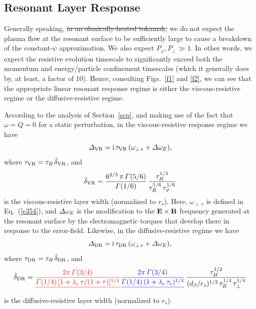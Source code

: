 \documentclass[12pt,prb,aps]{revtex4-1}
\providecommand{\DIFadd}[1]{{\protect\color{blue}\uwave{#1}}} %
\providecommand{\DIFdel}[1]{{\protect\color{red}\sout{#1}}}                      %
\providecommand{\DIFaddbegin}{} %
\providecommand{\DIFaddend}{} %
\providecommand{\DIFdelbegin}{} %
\providecommand{\DIFdelend}{} %
\begin{document}
\subsection{Resonant Layer Response}
Generally speaking, \DIFdelbegin \DIFdel{in an ohmically-heated tokamak, }\DIFdelend we do not expect the plasma flow at the resonant surface to be sufficiently
large to cause a breakdown of the constant-$\psi$ approximation. We also expect $P_\varphi, P_\perp \gg 1$. In other
words, we expect the resistive evolution timescale to significantly exceed both the momentum and energy/particle
confinement timescales (which it generally does by, at least, a factor of 10). Hence, consulting Figs.~\ref{f1} and \ref{f2},
we can see that the appropriate linear resonant response regime is either the viscous-resistive regime or the diffusive-resistive
regime. 

According to the analysis of Section~\ref{scp}, and making use of the fact that $\omega=Q=0$ for a static perturbation, 
in the viscous-resistive response regime we have
\begin{equation}
{\mit\Delta}_{\rm VR} = {\rm i}\,\tau_{\rm VR}\,(\omega_{\perp\,e}+{\mit\Delta}\omega_E),
\end{equation}
where $\tau_{\rm VR} = \tau_R\,\hat{\delta}_{\rm VR}$, and
\begin{equation}
\hat{\delta}_{\rm VR} = \frac{6^{2/3}\,\pi\,{\mit\Gamma}(5/6)}{{\mit\Gamma}(1/6)}\,\frac{\tau_H^{1/3}}{\tau_R^{1/6}\,\tau_\varphi^{1/6}}
\end{equation}
is the viscous-resistive layer width (normalized to $r_s$). Here, $\omega_{\perp\,e}$ is defined in Eq.~(\ref{e354}), and
${\mit\Delta}\omega_E$ is the modification to the ${\bf E}\times{\bf B}$ frequency generated at the resonant surface by
the electromagnetic torques that develop there in response to the error-field. Likewise, in the
diffusive-resistive regime we have
\begin{equation}
{\mit\Delta}_{\rm DR} = {\rm i}\,\tau_{\rm DR}\,(\omega_{\perp\,e}+{\mit\Delta}\omega_E),
\end{equation}
where $\tau_{\rm DR} = \tau_R\,\hat{\delta}_{\rm DR}$, and
\begin{equation}
\hat{\delta}_{\rm DR} = \DIFdelbegin \DIFdel{\frac{2\pi\,{\mit\Gamma}(3/4)}{{\mit\Gamma}(1/4)\,[1+\lambda_e\,\tau/(1+\tau)]^{1/4}}}\DIFdelend \DIFaddbegin \DIFadd{\frac{2\pi\,{\mit\Gamma}(3/4)}{{\mit\Gamma}(1/4)\,(1+\lambda_e\,\tau_e)^{1/4}}}\DIFaddend \,
\frac{\tau_H^{1/2}}{(d_\beta/r_s)^{1/2}\,\tau_R^{1/4}\,\tau_\perp^{1/4}}
\end{equation}
is the diffusive-resistive layer width (normalized to $r_s$).
\end{document}
